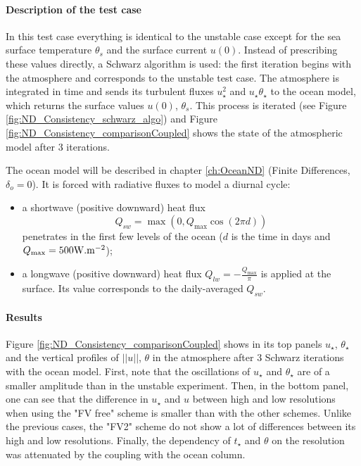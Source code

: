 \paragraph{Description of the test case}
In this test case everything is identical to the
unstable case except for the sea surface temperature
$\theta_s$ and the surface current $u(0)$.
Instead of prescribing these values directly,
a Schwarz algorithm is used: the first iteration
begins with the atmosphere and corresponds to
the unstable test case.
The atmosphere is integrated in time
and sends its turbulent fluxes $u_\star^2$ and
$u_\star \theta_\star$ to the ocean model, which
returns the surface values $u(0)$, $\theta_s$.
This process is iterated (see Figure
\ref{fig:ND_Consistency_schwarz_algo}) and
Figure \ref{fig:ND_Consistency_comparisonCoupled} shows
the state of the atmospheric model after 3 iterations.
\par
The ocean model will be described in chapter
\ref{ch:OceanND} (Finite Differences, $\delta_o=0$).
It is forced with radiative fluxes
to model a diurnal cycle:
\begin{itemize}
\item
	a shortwave (positive downward) heat flux
	\begin{equation}
		Q_{sw}=\max(0,Q_{\max} \cos(2\pi d))
	\end{equation}
	penetrates in the first few levels of the ocean ($d$ is
	the time in days and $Q_{\max} = 500 {\rm W}.{\rm m}^{-2}$);
\item  a longwave (positive downward) heat flux
	$Q_{lw} = -\frac{Q_{\max}}{\pi}$ is applied at the surface.
	Its value corresponds to the daily-averaged $Q_{sw}$.
\end{itemize}
\paragraph{Results}
Figure \ref{fig:ND_Consistency_comparisonCoupled}
shows in its top panels $u_\star$, $\theta_\star$ and
the vertical profiles of $||u||$, $\theta$ in the atmosphere
after 3 Schwarz iterations with the ocean model.
First, note that the oscillations of $u_\star$ and $\theta_\star$
are of a smaller amplitude than in the unstable experiment.
Then, in the bottom panel, one can see that the difference
in $u_\star$ and $u$ between high and low resolutions when using
the "FV free" scheme is smaller than with the other schemes.
Unlike the previous cases, the "FV2"
scheme do not show a lot of differences between
its high and low resolutions.
Finally, the dependency of $t_\star$ and $\theta$ on the resolution
was attenuated by the coupling with the ocean column.

